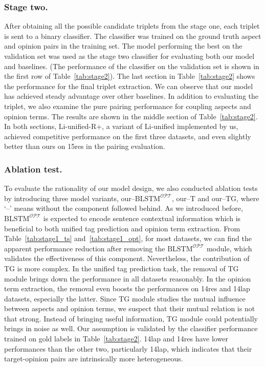 \documentclass[letterpaper]{article} \usepackage{aaai20}  \usepackage{times}  \usepackage{helvet} \usepackage{courier}  \usepackage[hyphens]{url}  \usepackage{graphicx} \urlstyle{rm} \def\UrlFont{\rm}  \usepackage{graphicx}  \frenchspacing  \setlength{\pdfpagewidth}{8.5in}  \setlength{\pdfpageheight}{11in}
\begin{document}
\subsubsection{Stage two.}
After obtaining all the possible candidate triplets from the stage one, each triplet is sent to a binary classifier. The classifier was trained on the ground truth aspect and opinion pairs in the training set. 
The model performing the best on the validation set was used as the stage two classifier for evaluating both our model and baselines. (The performance of the classifier on the validation set is shown in the first row of Table~\ref{tab:stage2}). 
The last section in Table~\ref{tab:stage2} shows the performance for the final triplet extraction. We can observe that our model has achieved steady advantage over other baselines. In addition to evaluating the triplet, we also examine the pure pairing performance for coupling aspects and opinion terms. The results are shown in the middle section of Table~\ref{tab:stage2}. In both sections, Li-unified-R+, a variant of Li-unified implemented by us, achieved competitive performance on the first three datasets, and even slightly better than ours on 15res in the pairing evaluation.


\subsubsection{Ablation test.}
To evaluate the rationality of our model design, we also conducted ablation tests by introducing three model variants, our--$\text{BLSTM}^{\mathcal{OPT}}$, our--T and our--TG, where `--' means without the component followed behind. As we introduced before, $\text{BLSTM}^{\mathcal{OPT}}$ is expected to encode sentence contextual information which is beneficial to both unified tag prediction and opinion term extraction. 
From Table~\ref{tab:stage1_ts} and~\ref{tab:stage1_opt}, for most datasets, we can find the apparent performance reduction after removing the $\text{BLSTM}^{\mathcal{OPT}}$ module, which validates the effectiveness of this component.
Nevertheless, the contribution of TG is more complex. In the unified tag prediction task, the removal of TG module brings down the performance in all datasets reasonably. 
In the opinion term extraction, the removal even boosts the performances on 14res and 14lap datasets, especially the latter. Since TG module studies the mutual influence between aspects and opinion terms, we suspect that their mutual relation is not that strong.
Instead of bringing useful information, TG module could potentially brings in noise as well. Our assumption is validated by the classifier performance trained on gold labels in Table~\ref{tab:stage2}. 14lap and 14res have lower performances than the other two, particularly 14lap, which indicates that their target-opinion pairs are intrinsically more heterogeneous.
\end{document}
